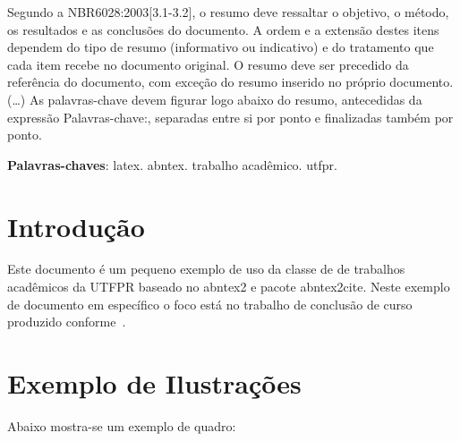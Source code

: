 \documentclass[12pt,openright,oneside,chapter=TITLE,section=TITLE,
	brazil]{utfpr-pg}
\begin{document}
\frenchspacing 
\pretextual
\imprimircapa
\imprimirfolhaderosto*

\begin{resumo}
Segundo a NBR6028:2003[3.1-3.2], o resumo deve ressaltar o objetivo, o método, os resultados e as conclusões do documento. A ordem e a extensão destes itens dependem do tipo de resumo (informativo ou indicativo) e do tratamento que cada item recebe no documento original. O resumo deve ser precedido da referência do documento, com exceção do resumo inserido no próprio documento. (\ldots) As palavras-chave devem figurar logo abaixo do resumo, antecedidas da expressão Palavras-chave:, separadas entre si por ponto e finalizadas também por ponto.

\vspace{\onelineskip}
\noindent
\textbf{Palavras-chaves}: latex. abntex. trabalho acadêmico. utfpr.
\end{resumo}

\listoffigures*
\cleardoublepage

\listofquadros*
\cleardoublepage

\listoftables*
\cleardoublepage


\tableofcontents*
\cleardoublepage



\textual

\chapter{Introdução}
Este documento é um pequeno exemplo de uso da classe de de trabalhos acadêmicos da UTFPR baseado no \textsf{abntex2} e pacote \textsf{abntex2cite}. Neste exemplo de documento em específico o foco está no trabalho de conclusão de curso produzido conforme~.

\chapter{Exemplo de Ilustrações}
Abaixo mostra-se um exemplo de quadro:
\end{document}
